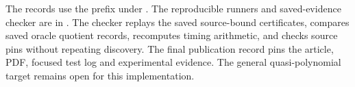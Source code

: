 The records use the  prefix under
.  The reproducible runners and saved-evidence checker
are in .  The checker replays the saved
source-bound certificates, compares saved oracle quotient records,
recomputes timing arithmetic, and checks source pins without repeating
discovery.  The final publication record pins the article, PDF, focused
test log and experimental evidence.  The general quasi-polynomial target
remains open for this implementation.
